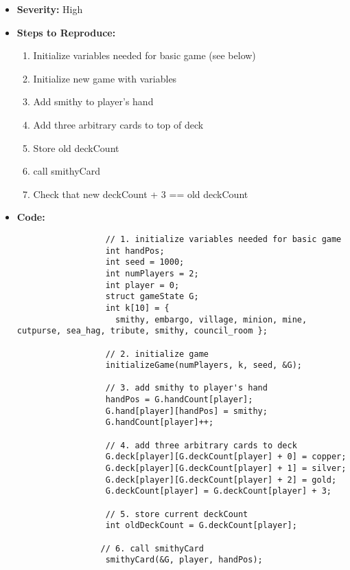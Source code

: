 \documentclass[11pt,letterpaper]{article}
\begin{document}
\begin{enumerate}[label=\Roman*.]
\begin{itemize}[label=]
\begin{itemize}[label=]
          \item \textbf{Severity:} High
          \item \textbf{Steps to Reproduce:} 
            \begin{enumerate}
              \item Initialize variables needed for basic game (see below)
              \item Initialize new game with variables
              \item Add smithy to player's hand
              \item Add three arbitrary cards to top of deck
              \item Store old deckCount
              \item call smithyCard
              \item Check that new deckCount + 3 == old deckCount
            \end{enumerate}
          \item \textbf{Code:} 

                \begin{lstlisting}
                  // 1. initialize variables needed for basic game
                  int handPos;                             
                  int seed = 1000;                      
                  int numPlayers = 2;                   
                  int player = 0;                       
                  struct gameState G;
                  int k[10] = {
                    smithy, embargo, village, minion, mine, cutpurse, sea_hag, tribute, smithy, council_room }; 

                  // 2. initialize game
                  initializeGame(numPlayers, k, seed, &G);

                  // 3. add smithy to player's hand
                  handPos = G.handCount[player];
                  G.hand[player][handPos] = smithy;
                  G.handCount[player]++;

                  // 4. add three arbitrary cards to deck
                  G.deck[player][G.deckCount[player] + 0] = copper;
                  G.deck[player][G.deckCount[player] + 1] = silver;
                  G.deck[player][G.deckCount[player] + 2] = gold;
                  G.deckCount[player] = G.deckCount[player] + 3;

                  // 5. store current deckCount
                  int oldDeckCount = G.deckCount[player];

                 // 6. call smithyCard
                  smithyCard(&G, player, handPos);


\end{lstlisting}
\end{itemize}
\end{itemize}
\end{enumerate}
\end{document}
